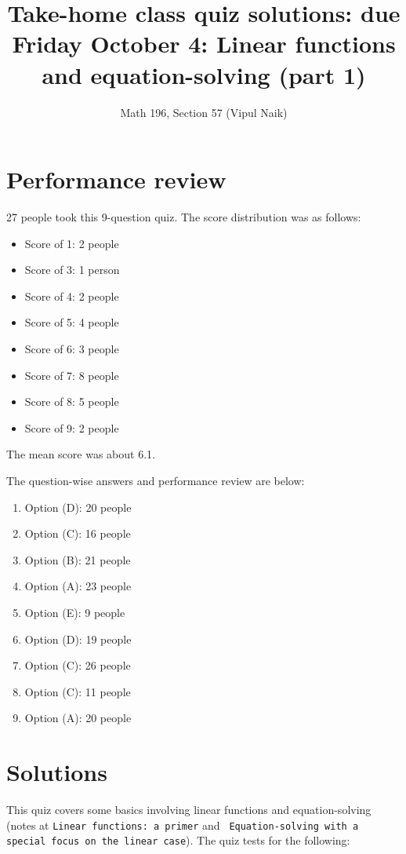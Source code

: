 \documentclass[10pt]{amsart}
\title{Take-home class quiz solutions: due Friday October 4: Linear functions and equation-solving (part 1)}
\author{Math 196, Section 57 (Vipul Naik)}
\begin{document}
\maketitle

\section{Performance review}

27 people took this 9-question quiz. The score distribution was as
follows:

\begin{itemize}
\item Score of 1: 2 people
\item Score of 3: 1 person
\item Score of 4: 2 people
\item Score of 5: 4 people
\item Score of 6: 3 people
\item Score of 7: 8 people
\item Score of 8: 5 people
\item Score of 9: 2 people
\end{itemize}

The mean score was about 6.1.

The question-wise answers and performance review are below:

\begin{enumerate}
\item Option (D): 20 people
\item Option (C): 16 people
\item Option (B): 21 people
\item Option (A): 23 people
\item Option (E): 9 people
\item Option (D): 19 people
\item Option (C): 26 people
\item Option (C): 11 people
\item Option (A): 20 people
\end{enumerate}

\section{Solutions}

This quiz covers some basics involving linear functions and
equation-solving (notes at {\tt Linear functions: a primer} and {\tt
  Equation-solving with a special focus on the linear case}). The quiz
tests for the following:
\end{document}
